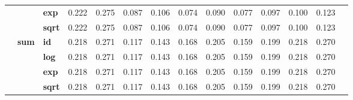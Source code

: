 \begin{table}[t]
{\begin{tabular}{cclccccccccccc}
    & & \textbf{exp} & 0.222 & 0.275 & 0.087 & 0.106 & 0.074 & 0.090& 0.077 & 0.097 & 0.100& 0.123 \\
    & & \textbf{sqrt} & 0.222 & 0.275 & 0.087 & 0.106 & 0.074 & 0.090& 0.077 & 0.097 & 0.100& 0.123 \\
\cmidrule{2-13}
& \multirow{4}{*}{\textbf{sum}}
      & \textbf{id} & 0.218 & 0.271 & 0.117 & 0.143 & 0.168 & 0.205 & 0.159 & 0.199 & 0.218 & 0.270\\
    & & \textbf{log} & 0.218 & 0.271 & 0.117 & 0.143 & 0.168 & 0.205 & 0.159 & 0.199 & 0.218 & 0.270\\
    & & \textbf{exp} & 0.218 & 0.271 & 0.117 & 0.143 & 0.168 & 0.205 & 0.159 & 0.199 & 0.218 & 0.270\\
    & & \textbf{sqrt} & 0.218 & 0.271 & 0.117 & 0.143 & 0.168 & 0.205 & 0.159 & 0.199 & 0.218 & 0.270\\
      \midrule


\end{tabular}}
\end{table}
